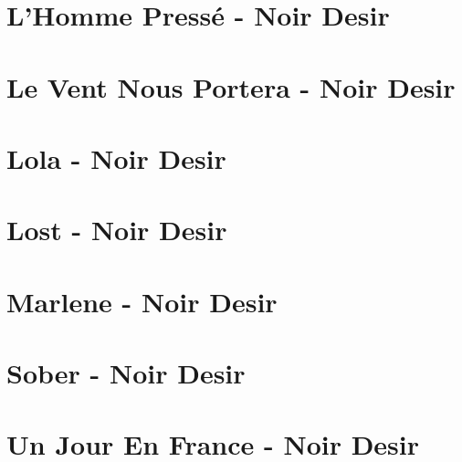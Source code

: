 \documentclass{guitartabs}
\begin{document}
\section{L'Homme Pressé - Noir Desir}
\begin{guitar}

\end{guitar}

\section{Le Vent Nous Portera - Noir Desir}
\begin{guitar}

\end{guitar}


\section*{Lola - Noir Desir}
\begin{guitar}

\end{guitar}


\section*{Lost - Noir Desir}
\begin{guitar}

\end{guitar}

\section*{Marlene - Noir Desir}
\begin{guitar}

\end{guitar}

\section*{Sober - Noir Desir}
\begin{guitar}

\end{guitar}


\section*{Un Jour En France - Noir Desir}
\begin{guitar}

\end{guitar}
\end{document}
